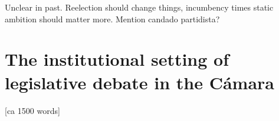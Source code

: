 \documentclass[letter,12pt]{article}
\begin{document}

Unclear in past. Reelection should change things, incumbency times static ambition should matter more. Mention candado partidista? 

\section{The institutional setting of legislative debate in the Cámara} [ca 1500 words]



\end{document}
